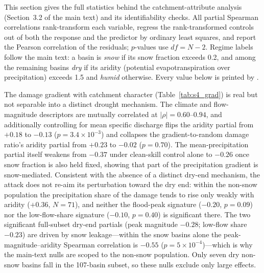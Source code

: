 \documentclass[final]{agujournal2019}
\begin{document}
This section gives the full statistics behind the catchment-attribute analysis (Section~3.2 of the main text) and its identifiability checks. All partial Spearman correlations rank-transform each variable, regress the rank-transformed controls out of both the response and the predictor by ordinary least squares, and report the Pearson correlation of the residuals; $p$-values use $df = N - 2$. Regime labels follow the main text: a basin is \emph{snow} if its snow fraction exceeds 0.2, and among the remaining basins \emph{dry} if its aridity (potential evapotranspiration over precipitation) exceeds 1.5 and \emph{humid} otherwise. Every value below is printed by .

The damage gradient with catchment character (Table~\ref{tab:s4_grad}) is real but not separable into a distinct drought mechanism. The climate and flow-magnitude descriptors are mutually correlated at $|\rho| = 0.60$--$0.94$, and additionally controlling for mean specific discharge flips the aridity partial from $+0.18$ to $-0.13$ ($p = 3.4\times10^{-3}$) and collapses the gradient-to-random damage ratio's aridity partial from $+0.23$ to $-0.02$ ($p = 0.70$). The mean-precipitation partial itself weakens from $-0.37$ under clean-skill control alone to $-0.26$ once snow fraction is also held fixed, showing that part of the precipitation gradient is snow-mediated. Consistent with the absence of a distinct dry-end mechanism, the attack does not re-aim its perturbation toward the dry end: within the non-snow population the precipitation share of the damage tends to rise only weakly with aridity ($+0.36$, $N = 71$), and neither the flood-peak signature ($-0.20$, $p = 0.09$) nor the low-flow-share signature ($-0.10$, $p = 0.40$) is significant there. The two significant full-subset dry-end partials (peak magnitude $-0.28$; low-flow share $-0.23$) are driven by snow leakage---within the snow basins alone the peak-magnitude--aridity Spearman correlation is $-0.55$ ($p = 5\times10^{-4}$)---which is why the main-text nulls are scoped to the non-snow population. Only seven dry non-snow basins fall in the 107-basin subset, so these nulls exclude only large effects.
\end{document}

